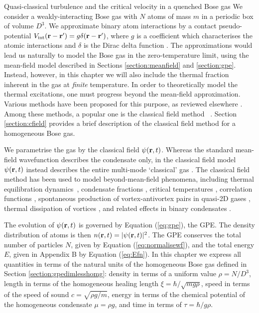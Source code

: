 \begin{chapter}{\label{cha:nonequib}Quasi-classical turbulence and the critical velocity in a quenched Bose gas}
We consider a weakly-interacting Bose gas with $N$ atoms of mass $m$ in a periodic box of volume $D^3$.  We approximate binary atom interactions by a contact pseudo-potential $V_{\mathrm{int}}({\bf r}-{\bf r'})= g \delta({\bf r}-{\bf r'})$, where $g$ is a coefficient which characterises the atomic interactions and $\delta$ is the Dirac delta function \cite{Pethick}. The approximations would lead us naturally to model the Bose gas in the zero-temperature limit, using the mean-field model described in Sections \ref{section:meanfield} and \ref{section:gpe}. Instead, however, in this chapter we will also include the thermal fraction inherent in the gas at {\it finite} temperature. In order to theoretically model the thermal excitations, one must progress beyond the mean-field approximation.
Various methods have been proposed for this purpose, as reviewed elsewhere
\cite{Pol_Rev,Proukakis,griffin2009bose,finite_temp_book,Blakie,berloff_2014}.
Among these methods, a popular one is the classical field method ~\cite{Svis5,Davis,PRL.87.210404,
PhysRevA.66.013603,Davis2,PhysRevLett.95.263901,Pol_Rev}. Section \ref{section:cfield} provides a brief description of the classical field method for a homogeneous Bose gas.

We parametrise the gas by the classical field $\psi({\bf r},t)$. Whereas the standard mean-field wavefunction describes the condensate only, in the classical field model $\psi({\bf r},t)$ instead describes the entire multi-mode `classical' gas \cite{Proukakis,Blakie}.  The classical field method has been used to model beyond-mean-field phenomena, including thermal equilibration dynamics~\cite{PhysRevA.66.013603,PhysRevLett.95.263901,pattinson_2014,nazarenko_2014}, condensate fractions \cite{Davis}, critical temperatures \cite{Davis2006}, correlation functions \cite{Wright2011}, spontaneous production of vortex-antivortex pairs in quasi-2D gases \cite{Simula}, thermal dissipation of vortices \cite{berloff_2007},  and related effects in binary condensates \cite{Berloff_2006,Salman20091482,pattinson_2014}.

The evolution of $\psi({\bf r},t)$ is governed by Equation (\ref{eq:gpe}), the GPE. The density distribution of atoms is then $n({\bf r},t)=|\psi({\bf r},t)|^2$.
The GPE conserves the total number of particles $N$, given by Equation (\ref{eq:normalisewf}), and the total energy $E$, given in Appendix B by Equation (\ref{eq:Efn}). In this chapter we express all quantities in terms of the natural units of the homogeneous Bose gas defined in Section \ref{section:gpedimlesshomg}:  density in terms of a uniform value $\rho = N/D^3$, length in terms of the homogeneous healing length $\xi=\hbar/\sqrt{m g \rho}$, speed in terms of the speed of sound $c=\sqrt{\rho g/m}$, energy in terms of the chemical potential of the homogeneous condensate $\mu=\rho g$, and time in terms of $\tau=\hbar / g \rho$.


\end{chapter}
